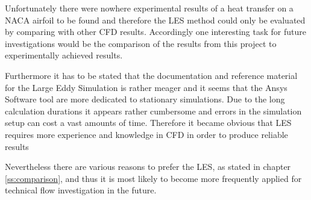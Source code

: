 Unfortunately there were nowhere experimental results of a heat transfer on a NACA airfoil to be found and therefore the LES method could only be evaluated by comparing with other CFD results.
Accordingly one interesting task for future investigations would be the comparison of the results from this project to experimentally achieved results.

Furthermore it has to be stated that the documentation and reference material for the Large Eddy Simulation is rather meager and it seems that the Ansys Software tool are more dedicated to stationary simulations. Due to the long calculation durations it appears rather cumbersome and errors in the simulation setup can cost a vast amounts of time. Therefore it became obvious that LES requires more experience and knowledge in CFD in order to produce reliable results

Nevertheless there are various reasons to prefer the LES, as stated in chapter \ref{ss:comparison}, and thus it is most likely to become more frequently applied for technical flow investigation in the future.
